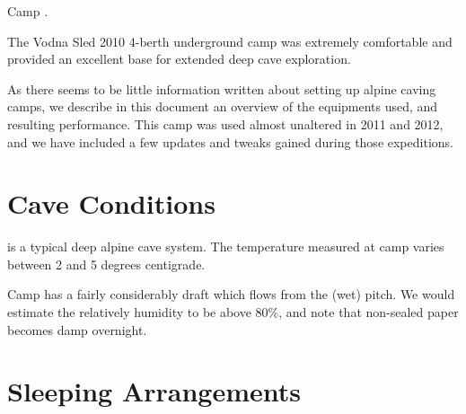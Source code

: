 \begin{marginfigure}
\checkoddpage \ifoddpage \forcerectofloat \else \forceversofloat \fi
\centering
 \caption{Camp \protect{}. }
 \label{camp}
\end{marginfigure}

The Vodna Sled 2010 4-berth underground camp was extremely comfortable
and provided an excellent base for extended deep cave exploration.

As there seems to be little information written about setting up alpine
caving camps, we describe in this document an overview of the equipments
used, and resulting performance. This camp was used almost unaltered in
2011 and 2012, and we have included a few updates and tweaks gained
during those expeditions.


\section{Cave Conditions}

 is a typical deep alpine cave system. The temperature measured at camp varies between 2 and 5 degrees centigrade.

Camp  has a fairly considerably draft which flows from the (wet)  pitch. We would estimate the relatively humidity to be above 80\%, and note
that non-sealed paper becomes damp overnight.

\section{Sleeping Arrangements}

